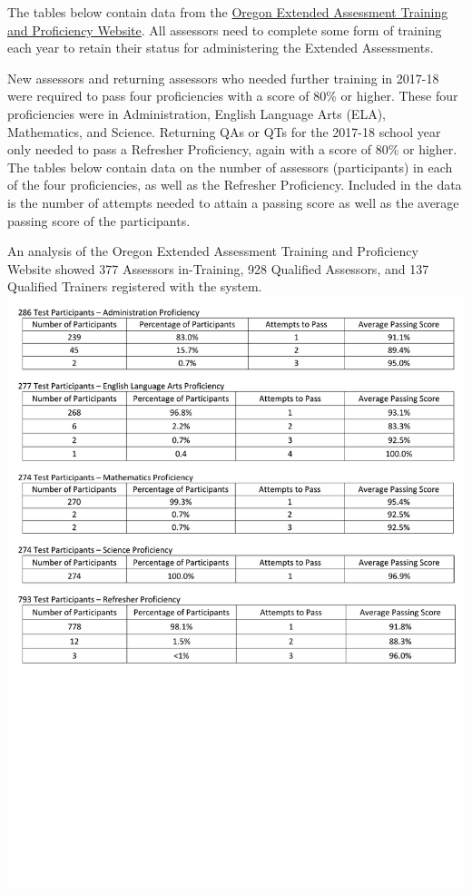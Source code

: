 \documentclass[]{article}
\begin{document}
The tables below contain data from the
\color{link}\href{http://or.k12test.com/}{Oregon Extended Assessment
Training and Proficiency Website}\color{black}. All assessors need to
complete some form of training each year to retain their status for
administering the Extended Assessments.

New assessors and returning assessors who needed further training in
2017-18 were required to pass four proficiencies with a score of 80\% or
higher. These four proficiencies were in Administration, English
Language Arts (ELA), Mathematics, and Science. Returning QAs or QTs for
the 2017-18 school year only needed to pass a Refresher Proficiency,
again with a score of 80\% or higher. The tables below contain data on
the number of assessors (participants) in each of the four
proficiencies, as well as the Refresher Proficiency. Included in the
data is the number of attempts needed to attain a passing score as well
as the average passing score of the participants.

An analysis of the Oregon Extended Assessment Training and Proficiency
Website showed 377 Assessors in-Training, 928 Qualified Assessors, and
137 Qualified Trainers registered with the system. \FloatBarrier
\includegraphics{Figures/TestPartic/QA_QT_TestPartic_1819}
\end{document}
